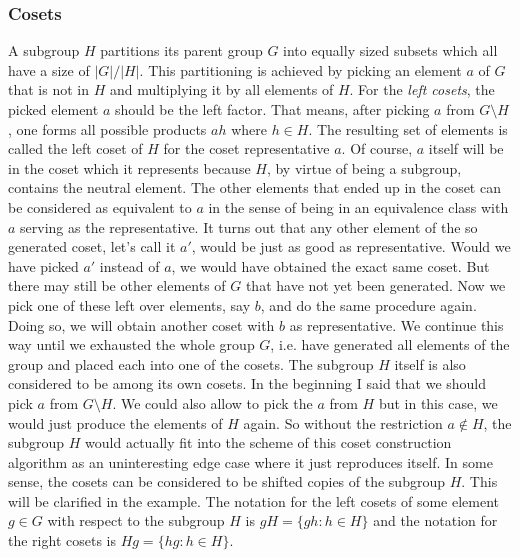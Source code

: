 \subsubsection{Cosets}
A subgroup $H$ partitions its parent group $G$ into equally sized subsets which all have a size of $|G| / |H|$. This partitioning is achieved by picking an element $a$ of $G$ that is not in $H$ and multiplying it by all elements of $H$. For the \emph{left cosets}, the picked element $a$ should be the left factor. That means, after picking $a$ from $G \setminus H$, one forms all possible products $a h$ where $h \in H$. The resulting set of elements is called the left coset of $H$ for the coset representative $a$. Of course, $a$ itself will be in the coset which it represents because $H$, by virtue of being a subgroup, contains the neutral element. The other elements that ended up in the coset can be considered as equivalent to $a$ in the sense of being in an equivalence class with $a$ serving as the representative. It turns out that any other element of the so generated coset, let's call it $a'$, would be just as good as representative. Would we have picked $a'$ instead of $a$, we would have obtained the exact same coset. But there may still be other elements of $G$ that have not yet been generated. Now we pick one of these left over elements, say $b$, and do the same procedure again. Doing so, we will obtain another coset with $b$ as representative. We continue this way until we exhausted the whole group $G$, i.e. have generated all elements of the group and placed each into one of the cosets. The subgroup $H$ itself is also considered to be among its own cosets. In the beginning I said that we should pick $a$ from $G \setminus H$. We could also allow to pick the $a$ from $H$ but in this case, we would just produce the elements of $H$ again. So without the restriction $a \notin H$, the subgroup $H$ would actually fit into the scheme of this coset construction algorithm as an uninteresting edge case where it just reproduces itself. In some sense, the cosets can be considered to be shifted copies of the subgroup $H$. This will be clarified in the example. The notation for the left cosets of some element $g \in G$ with respect to the subgroup $H$ is $g H = \{ g h : h \in H \}$ and the notation for the right cosets is $H g = \{ h g : h \in H \}$.


